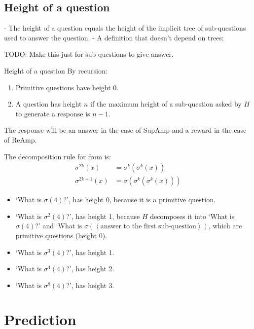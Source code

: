 \documentclass{farlamp}
\begin{document}
\subsection{Height of a question}

- The height of a question equals the height of the implicit tree of
sub-questions used to answer the question.
- A definition that doesn't depend on trees:

TODO: Make this just for sub-questions to give answer.
\begin{definition}{Height of a question} By recursion:
    \begin{enumerate}
    \item Primitive questions have height 0.
    \item A question has height $n$ if the maximum height of a sub-question
        asked by $H$ to generate a response is $n-1$.
    \end{enumerate}
The response will be an answer in the case of SupAmp and a reward in the case of
ReAmp.
\end{definition}

\begin{example}
    The decomposition rule for  from \textcite[table
    3]{CSASupAmp} is:
    \begin{align}
        \sigma^{2k}(x) &= \sigma^k(\sigma^k(x)) \\
        \sigma^{2k+1}(x) &= \sigma(\sigma^k(\sigma^k(x)))
    \end{align}

    \begin{itemize}
        \item ‘What is $\sigma(4)$?’, has height 0, because it is a primitive
            question.
        \item ‘What is $\sigma^2(4)$?’, has height 1, because $H$ decomposes it
            into ‘What is $\sigma(4)$?’ and ‘What is $\sigma(\left<\text{answer
            to the first sub-question}\right>)$, which are primitive questions
            (height 0).
        \item ‘What is $\sigma^3(4)$?’, has height 1.
        \item ‘What is $\sigma^4(4)$?’, has height 2.
        \item ‘What is $\sigma^8(4)$?’, has height 3.
    \end{itemize}
\end{example}


\section{Prediction}
\label{sec:prediction}
\end{document}
